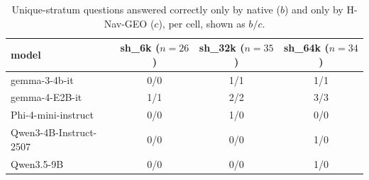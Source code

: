 \documentclass[11pt]{article}
\newcommand{\sub}[1]{\textsf{sh\_#1}}                    %
\newcommand{\geo}{H-Nav-GEO}
\begin{document}
\begin{table}[htbp]\centering\small
\caption{Unique-stratum questions answered correctly only by native ($b$) and only by \geo{} ($c$), per cell, shown as $b/c$.}
\label{tab:flips}
\begin{tabular}{lccc}\toprule
model & \sub{6k} ($n=26$) & \sub{32k} ($n=35$) & \sub{64k} ($n=34$)\\\midrule
gemma-3-4b-it          & 0/0 & 1/1 & 1/1\\
gemma-4-E2B-it         & 1/1 & 2/2 & 3/3\\
Phi-4-mini-instruct    & 0/0 & 1/0 & 0/0\\
Qwen3-4B-Instruct-2507 & 0/0 & 0/0 & 1/0\\
Qwen3.5-9B             & 0/0 & 0/0 & 1/0\\\bottomrule
\end{tabular}\end{table}
\end{document}
